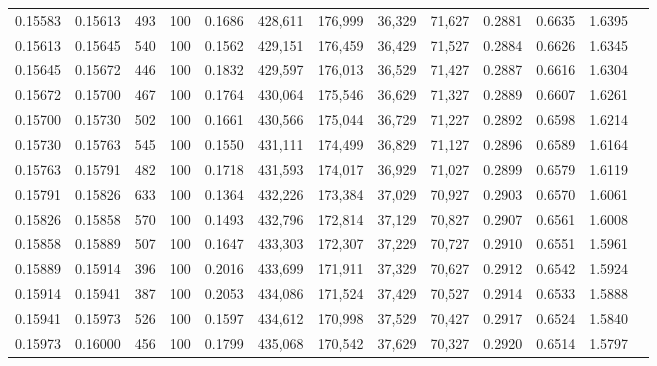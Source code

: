 \begin{tabular}{rrrrrrrrrrrrr}
0.15583 & 0.15613 &   493 & 100 &                                     0.1686 & 428,611 & 176,999 &  36,329 &  71,627 & 0.2881 & 0.6635 & 1.6395 \\
0.15613 & 0.15645 &   540 & 100 &                                     0.1562 & 429,151 & 176,459 &  36,429 &  71,527 & 0.2884 & 0.6626 & 1.6345 \\
0.15645 & 0.15672 &   446 & 100 &                                     0.1832 & 429,597 & 176,013 &  36,529 &  71,427 & 0.2887 & 0.6616 & 1.6304 \\
0.15672 & 0.15700 &   467 & 100 &                                     0.1764 & 430,064 & 175,546 &  36,629 &  71,327 & 0.2889 & 0.6607 & 1.6261 \\
0.15700 & 0.15730 &   502 & 100 &                                     0.1661 & 430,566 & 175,044 &  36,729 &  71,227 & 0.2892 & 0.6598 & 1.6214 \\
0.15730 & 0.15763 &   545 & 100 &                                     0.1550 & 431,111 & 174,499 &  36,829 &  71,127 & 0.2896 & 0.6589 & 1.6164 \\
0.15763 & 0.15791 &   482 & 100 &                                     0.1718 & 431,593 & 174,017 &  36,929 &  71,027 & 0.2899 & 0.6579 & 1.6119 \\
0.15791 & 0.15826 &   633 & 100 &                                     0.1364 & 432,226 & 173,384 &  37,029 &  70,927 & 0.2903 & 0.6570 & 1.6061 \\
0.15826 & 0.15858 &   570 & 100 &                                     0.1493 & 432,796 & 172,814 &  37,129 &  70,827 & 0.2907 & 0.6561 & 1.6008 \\
0.15858 & 0.15889 &   507 & 100 &                                     0.1647 & 433,303 & 172,307 &  37,229 &  70,727 & 0.2910 & 0.6551 & 1.5961 \\
0.15889 & 0.15914 &   396 & 100 &                                     0.2016 & 433,699 & 171,911 &  37,329 &  70,627 & 0.2912 & 0.6542 & 1.5924 \\
0.15914 & 0.15941 &   387 & 100 &                                     0.2053 & 434,086 & 171,524 &  37,429 &  70,527 & 0.2914 & 0.6533 & 1.5888 \\
0.15941 & 0.15973 &   526 & 100 &                                     0.1597 & 434,612 & 170,998 &  37,529 &  70,427 & 0.2917 & 0.6524 & 1.5840 \\
0.15973 & 0.16000 &   456 & 100 &                                     0.1799 & 435,068 & 170,542 &  37,629 &  70,327 & 0.2920 & 0.6514 & 1.5797 \\

\end{tabular}
